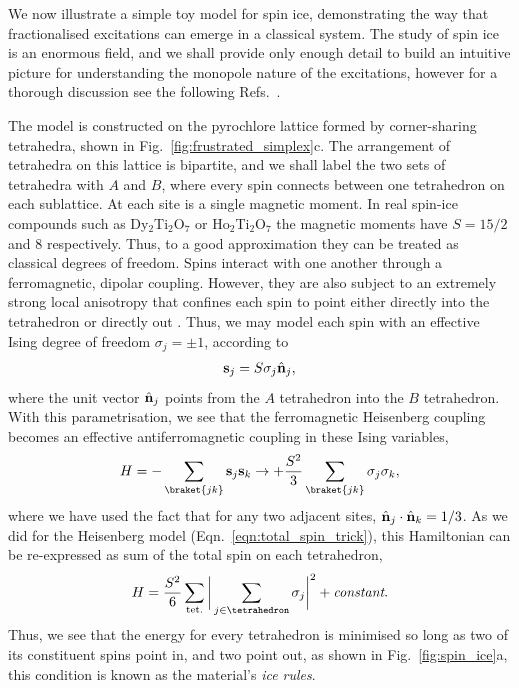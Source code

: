 We now illustrate a simple toy model for spin ice, demonstrating the way that fractionalised excitations can emerge in a classical system. The study of spin ice is an enormous field, and we shall provide only enough detail to build an intuitive picture for understanding the monopole nature of the excitations, however for a thorough discussion see the following Refs.~\cite{castelnovo_magnetic_2008,castelnovo_spin_2012,udagawa_spin_2021}.

The model is constructed on the pyrochlore lattice formed by corner-sharing tetrahedra, shown in Fig.~\ref{fig:frustrated_simplex}c. The arrangement of tetrahedra on this lattice is bipartite, and we shall label the two sets of tetrahedra with $A$ and $B$, where every spin connects between one tetrahedron on each sublattice. At each site is a single magnetic moment. In real spin-ice compounds such as Dy$_2$Ti$_2$O$_7$ or Ho$_2$Ti$_2$O$_7$ the magnetic moments have $S = 15/2$ and $8$ respectively. Thus, to a good approximation they can be treated as classical degrees of freedom. Spins interact with one another through a ferromagnetic, dipolar coupling.
However, they are also subject to an extremely strong local anisotropy that confines each spin to point either directly into the tetrahedron or directly out \cite{bramwell_spin_2001}. Thus, we may model each spin with an effective Ising degree of freedom $\sigma_j = \pm 1$, according to
\begin{align}
    \textbf{s}_j = S \sigma_j \hat {\textbf n}_j,
\end{align}
where the unit vector $\hat {\textbf n}_j$ points from the $A$ tetrahedron into the $B$ tetrahedron. With this parametrisation, we see that the ferromagnetic Heisenberg coupling becomes an effective antiferromagnetic coupling in these Ising variables,
\begin{align}
    H = -\sum_{\braket{jk}} \textbf{s}_j \textbf{s}_k 
    \rightarrow 
    +\frac{S^2}{3}\sum_{\braket{jk}} \sigma_j \sigma_k,
\end{align}
where we have used the fact that for any two adjacent sites, $ \hat {\textbf n}_j \cdot  \hat {\textbf n}_k = 1/3$. As we did for the Heisenberg model (Eqn.~\ref{eqn:total_spin_trick}), this Hamiltonian can be re-expressed as sum of the total spin on each tetrahedron,
\begin{align} \label{eqn:ice_rules}
    H = \frac{S^2}{6} \sum_{\textup{tet.}} 
    \bigg |
    \sum_{j \in\tetrahedron} \sigma_j
    \bigg |^2 + \textit{constant}.
\end{align}
Thus, we see that the energy for every tetrahedron is minimised so long as two of its constituent spins point in, and two point out, as shown in Fig.~\ref{fig:spin_ice}a, this condition is known as the material's \textit{ice rules}. 

